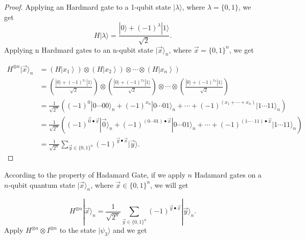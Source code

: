 \begin{proof}
Applying an Hardmard gate to a 1-qubit state $|\lambda\rangle$, where $\lambda = \{0,1\}$, we get 
\begin{equation}
    H|\lambda\rangle = \frac{|0\rangle + (-1)^{\lambda}|1\rangle}{\sqrt{2}}.
\end{equation}
Applying n Hardmard gates to an n-qubit state $|\vec{x}\rangle_n$, where $\vec{x} = \{0,1\}^n$, we get 

\begin{equation}
\begin{aligned}
H ^{\otimes n}|\vec{x}\rangle_n
& = \left(H\left|x_1\right\rangle\right) \otimes\left(H\left|x_2\right\rangle\right) \otimes \cdots \otimes\left(H\left|x_n\right\rangle\right) \\
& = \left(\frac{|0\rangle+(-1)^{x_1}|1\rangle}{\sqrt{2}}\right) \otimes\left(\frac{|0\rangle+(-1)^{x_2}|1\rangle}{\sqrt{2}}\right) \otimes \cdots \otimes\left(\frac{|0\rangle+(-1)^{x_n}|1\rangle}{\sqrt{2}}\right) \\
& = \frac{1}{\sqrt{2^n}}\left((-1)^{0}|0 \cdots 00\rangle_n+(-1)^{x_n}|0 \cdots 01\rangle_n+\cdots+(-1)^{\left(x_1+\cdots+x_n\right)}|1 \cdots 11\rangle_n\right) \\
& = \frac{1}{\sqrt{2^n}}\left((-1)^{\vec{0} \bullet \vec{x}}|\vec{0}\rangle_n+(-1)^{(0 \cdots 01) \bullet \vec{x}}|0 \cdots 01\rangle_n+\cdots+(-1)^{(1\cdots \cdot 11) \bullet \vec{x}}|1\cdots 11\rangle_n\right) \\
& = \frac{1}{\sqrt{2^n}}\sum_{\vec{y} \in\{0,1\}^n}(-1)^{\vec{y} \bullet \vec{x}}|\vec{y}\rangle.
\end{aligned}
\end{equation}
\end{proof}
According to the property of Hadamard Gate, if we apply $n$ Hadamard gates on a $n$-qubit quantum state $|\vec{x}\rangle_n$, where $\vec{x} \in \{0,1\}^n$, we will get

\begin{equation}
    H^{\otimes n}|\vec{x}\rangle_n = \frac{1}{\sqrt{2^n}} \sum_{\vec{y} \in\{0,1\}^n}(-1)^{\vec{y} \bullet \vec{x}}|\vec{y}\rangle_n.
\end{equation} 
Apply $H^{\otimes n} \otimes I^{\otimes n}$ to the state $|\psi_3\rangle$ and we get 

